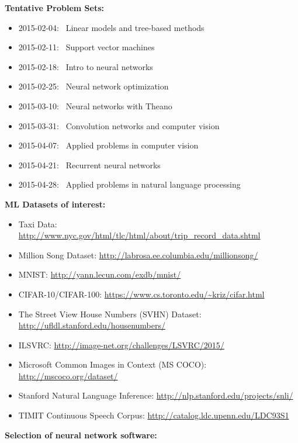 \documentclass[12pt]{article}
\begin{document}
{\bf Tentative Problem Sets:}
\begin{itemize}\setlength\itemsep{0em}
\item 2015-02-04: \, Linear models and tree-based methods
\item 2015-02-11: \, Support vector machines
\item 2015-02-18: \, Intro to neural networks
\item 2015-02-25: \, Neural network optimization
\item 2015-03-10: \, Neural networks with Theano
\item 2015-03-31: \, Convolution networks and computer vision
\item 2015-04-07: \, Applied problems in computer vision
\item 2015-04-21: \, Recurrent neural networks
\item 2015-04-28: \, Applied problems in natural language processing
\end{itemize}

\vspace{0.5cm}

{\bf ML Datasets of interest:}

\begin{itemize}\setlength\itemsep{0em}
\item Taxi Data: \url{http://www.nyc.gov/html/tlc/html/about/trip_record_data.shtml}
\item Million Song Dataset: \url{http://labrosa.ee.columbia.edu/millionsong/}
\item MNIST: \url{http://yann.lecun.com/exdb/mnist/}
\item CIFAR-10/CIFAR-100: \url{https://www.cs.toronto.edu/~kriz/cifar.html}
\item The Street View House Numbers (SVHN) Dataset: \url{http://ufldl.stanford.edu/housenumbers/}
\item ILSVRC: \url{http://image-net.org/challenges/LSVRC/2015/}
\item Microsoft Common Images in Context (MS COCO): \url{http://mscoco.org/dataset/}
\item Stanford Natural Language Inference: \url{http://nlp.stanford.edu/projects/snli/}
\item TIMIT Continuous Speech Corpus: \url{http://catalog.ldc.upenn.edu/LDC93S1}
\end{itemize}

{\bf Selection of neural network software:}
\end{document}
